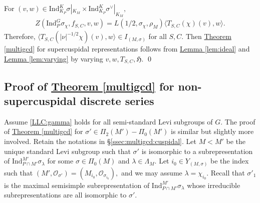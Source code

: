 \documentclass[10pt]{amsart}
\newtheorem{corollary}{Corollary}[theorem]
\theoremstyle{definition}
\numberwithin{equation}{section}
\DeclareMathOperator{\supp}{\mathrm{supp}}
\numberwithin{equation}{subsection}
\newcommand{\Ind}{\mathrm{Ind}}
\renewcommand{\Im}{\mathop{\mathrm{Im}}}
\newcommand{\HP}{\mathop{\mathrm{HP}}\nolimits}
\begin{document}


    For $(v,w)\in \mathrm{Ind}_{K_P}^K  \sigma|_{K_M}\times \mathrm{Ind}_{K_P}^K \sigma^\lor|_{K_M},$
    \begin{align*}
    Z(\mathrm{Ind}_P^G\sigma_\chi,f_{S,C},v,w)=L(1/2,\sigma_\chi,\rho_{M})\langle T_{S,C}(\chi)(v),w\rangle.
    \end{align*}
    Therefore, $\langle T_{S,C}(|\nu|^{-1/2}\chi)(v),w\rangle\in I_{(M,\sigma)}$ for all $S,C$. Then \hyperref[multigcd]{Theorem \ref{multigcd}} for supercuspidal representations follows from \hyperref[lem:ideal]{Lemma \ref{lem:ideal}} and \hyperref[lem:varying]{Lemma \ref{lem:varying}} by varying $v,w,T_{S,C},\mathfrak{H}.$ \qed



\subsection{Proof of \hyperref[multigcd]{Theorem \ref{multigcd}} for non-supercuspidal discrete series}\label{ssec:multigcd:noncuspidal}

Assume \eqref{LLC:gamma} holds for all semi-standard Levi subgroups of $G$. The proof of \hyperref[multigcd]{Theorem \ref{multigcd}} for $\sigma'\in \Pi_2(M')-\Pi_0(M')$ is similar but slightly more involved. Retain the notations in \S \ref{ssec:multigcd:cuspidal}. Let $M< M'$ be the unique standard Levi subgroup such that $\sigma'$ is isomorphic to a subrepresentation of $\Ind_{P
\cap M'}^{M'}\sigma_{\lambda}$ for some $\sigma\in \Pi_0(M)$ and $\lambda\in \Lambda_{M}.$   Let $i_0\in Y_{(M,\sigma)}$ be the index such that $(M',\mathcal{O}_{\sigma'})=(M_{i_0},\mathcal{O}_{\sigma_{i_0}}),$ and we may assume $\lambda=\chi_{i_0}.$ Recall that $\sigma'_1$ is the maximal semisimple subrepresentation of $\Ind_{P\cap M'}^{M'} \sigma_{\lambda}$ whose irreducible subrepresentations are all isomorphic to $\sigma'$. 
\end{document}
